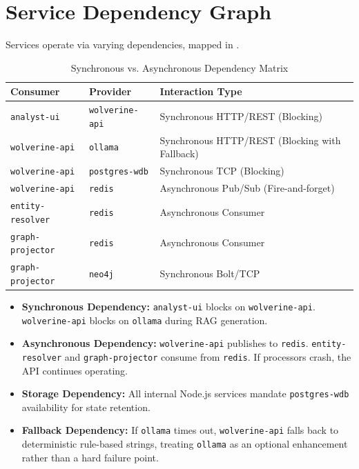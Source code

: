 \section{Service Dependency Graph}
\label{sec:arch-dependency}
Services operate via varying dependencies, mapped in .

\begin{table}[htbp]
\centering
\begin{tabular}{p{} p{} p{}}
\toprule
\textbf{Consumer} & \textbf{Provider} & \textbf{Interaction Type} \\
\midrule
\texttt{analyst-ui} & \texttt{wolverine-api} & Synchronous HTTP/REST (Blocking) \\
\texttt{wolverine-api} & \texttt{ollama} & Synchronous HTTP/REST (Blocking with Fallback) \\
\texttt{wolverine-api} & \texttt{postgres-wdb} & Synchronous TCP (Blocking) \\
\texttt{wolverine-api} & \texttt{redis} & Asynchronous Pub/Sub (Fire-and-forget) \\
\texttt{entity-resolver} & \texttt{redis} & Asynchronous Consumer \\
\texttt{graph-projector} & \texttt{redis} & Asynchronous Consumer \\
\texttt{graph-projector} & \texttt{neo4j} & Synchronous Bolt/TCP \\
\bottomrule
\end{tabular}
\caption{Synchronous vs. Asynchronous Dependency Matrix}
\label{tab:dependency-matrix}
\end{table}

\begin{itemize}
    \item \textbf{Synchronous Dependency:} \texttt{analyst-ui} blocks on \texttt{wolverine-api}. \texttt{wolverine-api} blocks on \texttt{ollama} during RAG generation.
    \item \textbf{Asynchronous Dependency:} \texttt{wolverine-api} publishes to \texttt{redis}. \texttt{entity-resolver} and \texttt{graph-projector} consume from \texttt{redis}. If processors crash, the API continues operating.
    \item \textbf{Storage Dependency:} All internal Node.js services mandate \texttt{postgres-wdb} availability for state retention.
    \item \textbf{Fallback Dependency:} If \texttt{ollama} times out, \texttt{wolverine-api} falls back to deterministic rule-based strings, treating \texttt{ollama} as an optional enhancement rather than a hard failure point.
\end{itemize}

